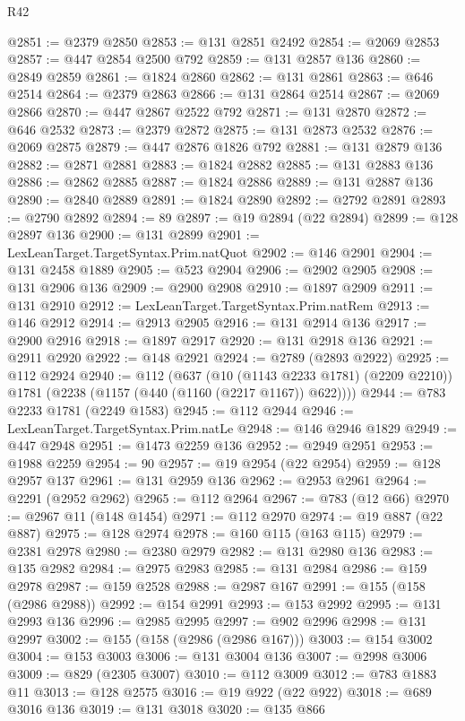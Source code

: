 \begin{lexlean}{R42}
\begin{coremodule}
@2851 := @2379 @2850
@2853 := @131 @2851 @2492
@2854 := @2069 @2853
@2857 := @447 @2854 @2500 @792
@2859 := @131 @2857 @136
@2860 := @2849 @2859
@2861 := @1824 @2860
@2862 := @131 @2861
@2863 := @646 @2514
@2864 := @2379 @2863
@2866 := @131 @2864 @2514
@2867 := @2069 @2866
@2870 := @447 @2867 @2522 @792
@2871 := @131 @2870
@2872 := @646 @2532
@2873 := @2379 @2872
@2875 := @131 @2873 @2532
@2876 := @2069 @2875
@2879 := @447 @2876 @1826 @792
@2881 := @131 @2879 @136
@2882 := @2871 @2881
@2883 := @1824 @2882
@2885 := @131 @2883 @136
@2886 := @2862 @2885
@2887 := @1824 @2886
@2889 := @131 @2887 @136
@2890 := @2840 @2889
@2891 := @1824 @2890
@2892 := @2792 @2891
@2893 := @2790 @2892
@2894 := 89
@2897 := @19 @2894 (@22 @2894)
@2899 := @128 @2897 @136
@2900 := @131 @2899
@2901 := LexLeanTarget.TargetSyntax.Prim.natQuot
@2902 := @146 @2901
@2904 := @131 @2458 @1889
@2905 := @523 @2904
@2906 := @2902 @2905
@2908 := @131 @2906 @136
@2909 := @2900 @2908
@2910 := @1897 @2909
@2911 := @131 @2910
@2912 := LexLeanTarget.TargetSyntax.Prim.natRem
@2913 := @146 @2912
@2914 := @2913 @2905
@2916 := @131 @2914 @136
@2917 := @2900 @2916
@2918 := @1897 @2917
@2920 := @131 @2918 @136
@2921 := @2911 @2920
@2922 := @148 @2921
@2924 := @2789 (@2893 @2922)
@2925 := @112 @2924
@2940 := @112
    (@637
      (@10 (@1143 @2233 @1781) (@2209 @2210))
      @1781
      (@2238 (@1157 (@440 (@1160 (@2217 @1167)) @622))))
@2944 := @783 @2233 @1781 (@2249 @1583)
@2945 := @112 @2944
@2946 := LexLeanTarget.TargetSyntax.Prim.natLe
@2948 := @146 @2946 @1829
@2949 := @447 @2948
@2951 := @1473 @2259 @136
@2952 := @2949 @2951
@2953 := @1988 @2259
@2954 := 90
@2957 := @19 @2954 (@22 @2954)
@2959 := @128 @2957 @137
@2961 := @131 @2959 @136
@2962 := @2953 @2961
@2964 := @2291 (@2952 @2962)
@2965 := @112 @2964
@2967 := @783 (@12 @66)
@2970 := @2967 @11 (@148 @1454)
@2971 := @112 @2970
@2974 := @19 @887 (@22 @887)
@2975 := @128 @2974
@2978 := @160 @115 (@163 @115)
@2979 := @2381 @2978
@2980 := @2380 @2979
@2982 := @131 @2980 @136
@2983 := @135 @2982
@2984 := @2975 @2983
@2985 := @131 @2984
@2986 := @159 @2978
@2987 := @159 @2528
@2988 := @2987 @167
@2991 := @155 (@158 (@2986 @2988))
@2992 := @154 @2991
@2993 := @153 @2992
@2995 := @131 @2993 @136
@2996 := @2985 @2995
@2997 := @902 @2996
@2998 := @131 @2997
@3002 := @155 (@158 (@2986 (@2986 @167)))
@3003 := @154 @3002
@3004 := @153 @3003
@3006 := @131 @3004 @136
@3007 := @2998 @3006
@3009 := @829 (@2305 @3007)
@3010 := @112 @3009
@3012 := @783 @1883 @11
@3013 := @128 @2575
@3016 := @19 @922 (@22 @922)
@3018 := @689 @3016 @136
@3019 := @131 @3018
@3020 := @135 @866

\end{coremodule}
\end{lexlean}
